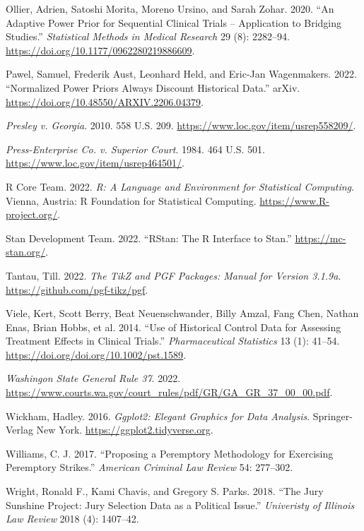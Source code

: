 \documentclass[12pt]{article}
\newlength{\cslhangindent}
\newlength{\cslentryspacingunit} %
\newenvironment{CSLReferences}[2] %
 {%
  \setlength{\parindent}{0pt}
  \ifodd #1
  \let\oldpar\par
  \def\par{\hangindent=\cslhangindent\oldpar}
  \fi
  \setlength{\parskip}{#2\cslentryspacingunit}
 }%
 {}
\begin{document}
\begin{CSLReferences}{1}{0}
\leavevmode{}%
Ollier, Adrien, Satoshi Morita, Moreno Ursino, and Sarah Zohar. 2020. {``An Adaptive Power Prior for Sequential Clinical Trials -- Application to Bridging Studies.''} \emph{Statistical Methods in Medical Research} 29 (8): 2282--94. \url{https://doi.org/10.1177/0962280219886609}.

\leavevmode{}%
Pawel, Samuel, Frederik Aust, Leonhard Held, and Eric-Jan Wagenmakers. 2022. {``Normalized Power Priors Always Discount Historical Data.''} arXiv. \url{https://doi.org/10.48550/ARXIV.2206.04379}.

\leavevmode{}%
\emph{Presley v. Georgia}. 2010. 558 U.S. 209. \url{https://www.loc.gov/item/usrep558209/}.

\leavevmode{}%
\emph{{Press-Enterprise Co. v. Superior Court}}. 1984. 464 U.S. 501. \url{https://www.loc.gov/item/usrep464501/}.

\leavevmode{}%
R Core Team. 2022. \emph{R: A Language and Environment for Statistical Computing}. Vienna, Austria: R Foundation for Statistical Computing. \url{https://www.R-project.org/}.

\leavevmode{}%
Stan Development Team. 2022. {``{RStan}: The {R} Interface to {Stan}.''} \url{https://mc-stan.org/}.

\leavevmode{}%
Tantau, Till. 2022. \emph{The TikZ and PGF Packages: Manual for Version 3.1.9a}. \url{https://github.com/pgf-tikz/pgf}.

\leavevmode{}%
Viele, Kert, Scott Berry, Beat Neuenschwander, Billy Amzal, Fang Chen, Nathan Enas, Brian Hobbs, et al. 2014. {``Use of Historical Control Data for Assessing Treatment Effects in Clinical Trials.''} \emph{Pharmaceutical Statistics} 13 (1): 41--54. \url{https://doi.org/doi.org/10.1002/pst.1589}.

\leavevmode{}%
\emph{Washingon State General Rule 37}. 2022. \url{https://www.courts.wa.gov/court_rules/pdf/GR/GA_GR_37_00_00.pdf}.

\leavevmode{}%
Wickham, Hadley. 2016. \emph{Ggplot2: Elegant Graphics for Data Analysis}. Springer-Verlag New York. \url{https://ggplot2.tidyverse.org}.

\leavevmode{}%
Williams, C. J. 2017. {``Proposing a Peremptory Methodology for Exercising Peremptory Strikes.''} \emph{American Criminal Law Review} 54: 277--302.

\leavevmode{}%
Wright, Ronald F., Kami Chavis, and Gregory S. Parks. 2018. {``The Jury Sunshine Project: Jury Selection Data as a Political Issue.''} \emph{Univeristy of Illinois Law Review} 2018 (4): 1407--42.

\end{CSLReferences}
\end{document}
